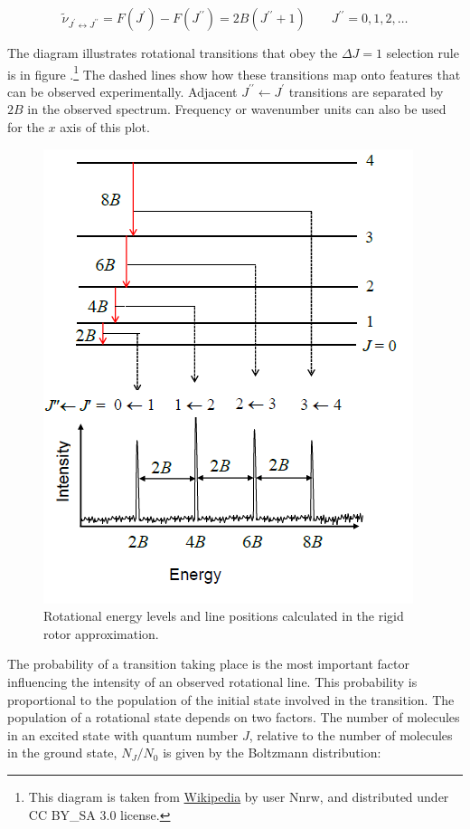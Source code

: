 \documentclass[
  9pt,
]{extbook}
\theoremstyle{definition}
\theoremstyle{definition}
\theoremstyle{definition}
\theoremstyle{remark}
\begin{document}
\begin{equation}
{\tilde  \nu }_{{J^{{\prime }}\leftrightarrow J^{{\prime \prime }}}}=F\left(J^{{\prime }}\right)-F\left(J^{{\prime \prime }}\right)=2B\left(J^{{\prime \prime }}+1\right)\qquad J^{{\prime \prime }}=0,1,2,\ldots
\label{eq:rot5}
\end{equation}

The diagram illustrates rotational transitions that obey the \(\Delta J=1\) selection rule is in figure .\footnote{This diagram is taken from \href{https://en.wikipedia.org/wiki/Rotational_spectroscopy\#/media/File:Rotational_spectrum_example.png}{Wikipedia} by user Nnrw, and distributed under CC BY\_SA 3.0 license.} The dashed lines show how these transitions map onto features that can be observed experimentally. Adjacent \(J^{{\prime \prime}}{\leftarrow}J^{{\prime }}\) transitions are separated by \(2B\) in the observed spectrum. Frequency or wavenumber units can also be used for the \(x\) axis of this plot.

\begin{figure}

{\centering \includegraphics[width=0.5\linewidth]{./img/OEP_wiki5} 

}

\caption{Rotational energy levels and line positions calculated in the rigid rotor approximation.}\label{fig:Fig1c13}
\end{figure}

The probability of a transition taking place is the most important factor influencing the intensity of an observed rotational line. This probability is proportional to the population of the initial state involved in the transition. The population of a rotational state depends on two factors. The number of molecules in an excited state with quantum number \(J\), relative to the number of molecules in the ground state, \(N_J/N_0\) is given by the Boltzmann distribution:
\end{document}
